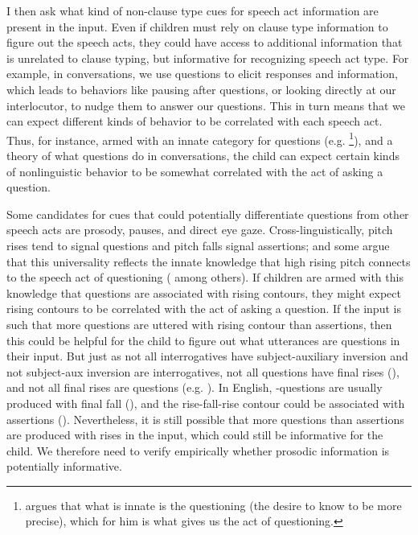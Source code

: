 I then %
ask what kind of non-clause type cues for speech act information are present in the input. Even if children must rely on clause type information to figure out the speech acts, they could have access to additional information that is unrelated to clause typing, but informative for recognizing speech act type. For example, in conversations, we use questions to elicit responses and information, which leads to behaviors like pausing after questions, or looking directly at our interlocutor, to nudge them to answer our questions. 
This in turn means that we can expect different kinds of behavior to be correlated with each speech act. Thus, for instance, armed with an innate category for questions (e.g. \cite{carruthers2018q}\footnote{\textcite{carruthers2018q} argues that what is innate is the questioning  (the desire to know to be more precise), which for him is what gives us the act of questioning.  }), and a theory of what questions do in conversations, the child can expect certain kinds of nonlinguistic behavior to be somewhat correlated with the act of asking a question. 

Some candidates for cues that could potentially differentiate questions from other speech acts are prosody, pauses, and direct eye gaze. Cross-linguistically, pitch rises tend to signal questions and pitch falls signal assertions; and some argue that this universality reflects the innate knowledge that high rising pitch connects to the speech act of questioning (\cite{ohala1984,gussenhovenchen2000,gussenhoven2002} among others). If children are armed with this knowledge that questions are associated with rising contours, they might expect rising contours to be correlated with the act of asking a question. If the input is such that more questions are uttered with rising contour than assertions, then this could be helpful for the child to figure out what utterances are  questions in their input. But just as not all interrogatives have subject-auxiliary inversion and not subject-aux inversion are interrogatives, not all questions have final rises (\cite{gussenhoven2000fallq, hedberg2004wh,ladd2008intonational}), and not all final rises are questions (e.g. \cite{gordon1999prosody,ladd1981, ward1985rfr,goodhue2016prosody}). In English, \twh-questions are usually produced with final fall (\cite{hedberg2004wh,ladd2008intonational}), and the rise-fall-rise contour could be associated with assertions (\cite{ladd1981, ward1985rfr,goodhue2016prosody}). Nevertheless, it is still possible that more questions than assertions are produced with rises in the input, which could still be informative for the child. We therefore need to verify empirically whether prosodic information is potentially informative.

